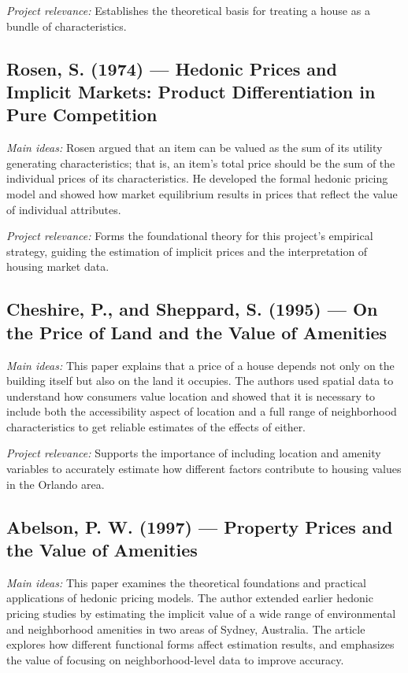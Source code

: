\documentclass[11pt]{article}
\begin{document}
\textit{Project relevance:} Establishes the theoretical basis for treating a house as a bundle of characteristics.

\subsection{Rosen, S. (1974) — Hedonic Prices and Implicit Markets: Product Differentiation in Pure Competition}  

\textit{Main ideas:} Rosen argued that an item can be valued as the sum of its utility generating characteristics; that is, an item’s total price should be the sum of the individual prices of its characteristics. He developed the formal hedonic pricing model and showed how market equilibrium results in prices that reflect the value of individual attributes.  

\textit{Project relevance:} Forms the foundational theory for this project’s empirical strategy, guiding the estimation of implicit prices and the interpretation of housing market data.

\subsection{Cheshire, P., and Sheppard, S. (1995) — On the Price of Land and the Value of Amenities}  

\textit{Main ideas:} This paper explains that a price of a house depends not only on the building itself but also on the land it occupies. The authors used spatial data to understand how consumers value location and showed that it is necessary to include both the accessibility aspect of location and a full range of neighborhood characteristics to get reliable estimates of the effects of either. 

\textit{Project relevance:} Supports the importance of including location and amenity variables to accurately estimate how different factors contribute to housing values in the Orlando area.

\subsection{Abelson, P. W. (1997) — Property Prices and the Value of Amenities}  

\textit{Main ideas:} This paper examines the theoretical foundations and practical applications of hedonic pricing models. The author extended earlier hedonic pricing studies by estimating the implicit value of a wide range of environmental and neighborhood amenities in two areas of Sydney, Australia. The article explores how different functional forms affect estimation results, and emphasizes the value of focusing on neighborhood-level data to improve accuracy. 
\end{document}
